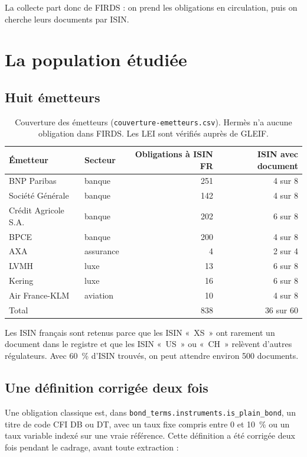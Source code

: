 \documentclass[11pt,a4paper]{article}
\begin{document}
La collecte part donc de FIRDS : on prend les obligations en circulation, puis on cherche leurs documents par ISIN.

\section{La population étudiée}
\label{sec:population}

\subsection{Huit émetteurs}

\begin{table}[H]
\small
\begin{tabularx}{\linewidth}{Ylrr}
\toprule
\textbf{Émetteur} & \textbf{Secteur} & \textbf{Obligations à ISIN FR} & \textbf{ISIN avec document} \\
\midrule
BNP Paribas & banque & 251 & 4 sur 8 \\
Société Générale & banque & 142 & 4 sur 8 \\
Crédit Agricole S.A. & banque & 202 & 6 sur 8 \\
BPCE & banque & 200 & 4 sur 8 \\
AXA & assurance & 4 & 2 sur 4 \\
LVMH & luxe & 13 & 6 sur 8 \\
Kering & luxe & 16 & 6 sur 8 \\
Air France-KLM & aviation & 10 & 4 sur 8 \\
\midrule
Total & & 838 & 36 sur 60 \\
\bottomrule
\end{tabularx}
\caption{Couverture des émetteurs (\texttt{couverture-emetteurs.csv}). Hermès n'a aucune obligation dans FIRDS. Les LEI sont vérifiés auprès de GLEIF.}
\end{table}

Les ISIN français sont retenus parce que les ISIN «~XS~» ont rarement un document dans le registre et que les ISIN «~US~» ou «~CH~» relèvent d'autres régulateurs. Avec 60~\% d'ISIN trouvés, on peut attendre environ 500 documents.

\subsection{Une définition corrigée deux fois}

Une obligation classique est, dans \texttt{bond\_terms.instruments.is\_plain\_bond}, un titre de code CFI DB ou DT, avec un taux fixe compris entre 0 et 10~\% ou un taux variable indexé sur une vraie référence. Cette définition a été corrigée deux fois pendant le cadrage, avant toute extraction :
\end{document}

